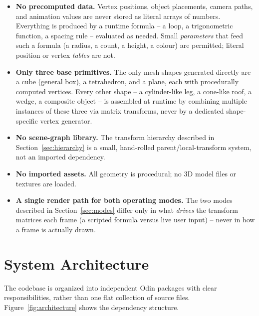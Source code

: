 \documentclass[11pt,a4paper]{article}
\begin{document}
\begin{itemize}[nosep]
  \item \textbf{No precomputed data.} Vertex positions, object
        placements, camera paths, and animation values are never stored
        as literal arrays of numbers. Everything is produced by a
        runtime formula -- a loop, a trigonometric function, a spacing
        rule -- evaluated as needed. Small \emph{parameters} that feed
        such a formula (a radius, a count, a height, a colour) are
        permitted; literal position or vertex \emph{tables} are not.
  \item \textbf{Only three base primitives.} The only mesh shapes
        generated directly are a cube (general box), a tetrahedron, and
        a plane, each with procedurally computed vertices. Every other
        shape -- a cylinder-like leg, a cone-like roof, a wedge, a
        composite object -- is assembled at runtime by combining
        multiple instances of these three via matrix transforms, never
        by a dedicated shape-specific vertex generator.
  \item \textbf{No scene-graph library.} The transform hierarchy
        described in Section~\ref{sec:hierarchy} is a small, hand-rolled
        parent/local-transform system, not an imported dependency.
  \item \textbf{No imported assets.} All geometry is procedural; no 3D
        model files or textures are loaded.
  \item \textbf{A single render path for both operating modes.} The two
        modes described in Section~\ref{sec:modes} differ only in what
        \emph{drives} the transform matrices each frame (a scripted
        formula versus live user input) -- never in how a frame is
        actually drawn.
\end{itemize}

\section{System Architecture}
\label{sec:architecture}

The codebase is organized into independent Odin packages with clear
responsibilities, rather than one flat collection of source files.
Figure~\ref{fig:architecture} shows the dependency structure.
\end{document}
